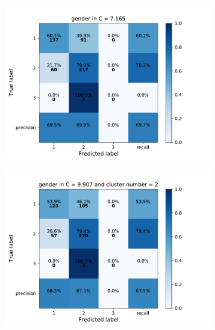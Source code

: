 {\begin{figure}[h]
    \centering
    \begin{subfigure}
      \centering
      \includegraphics[scale=0.45]{fig/super_lr_gender.pdf}
    \end{subfigure}%
    \begin{subfigure}
      \centering
      \includegraphics[scale=0.45]{fig/kms_lr_gender.pdf}
    \end{subfigure}
\end{figure}

}
